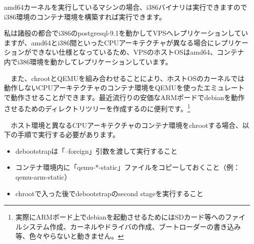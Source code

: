 \documentclass[mingoth,a4paper]{jsarticle}
\begin{document}
amd64カーネルを実行しているマシンの場合、i386バイナリは実行できますのでi386環境のコンテナ環境を構築すれば実行できます。

私は諸般の都合でi386のpostgresql-9.1を動かしてVPSへレプリケーションしていますが、amd64とi386間といったCPUアーキテクチャが異なる場合にレプリケーションができない仕様となっているため、VPSのホストOSはamd64、コンテナ内でi386環境を動かしてレプリケーションしています。


　また、chrootとQEMUを組み合わせることにより、ホストOSのカーネルでは動作しないCPUアーキテクチャのコンテナ環境をQEMUを使ったエミュレートで動作させることができます。最近流行りの安価なARMボードでdebianを動作させるためのディレクトリツリーを作成するのに便利です。\footnote{実際にARMボード上でdebianを起動させるためにはSDカード等へのファイルシステム作成、カーネルやドライバの作成、ブートローダーの書き込み等、色々やらないと動きません。}

　ホスト環境と異なるCPUアーキテクチャのコンテナ環境をchrootする場合、以下の手順で実行する必要があります。

\begin{itemize}
  \item debootstrapは「--foreign」引数を渡して実行すること
  \item コンテナ環境内に「qemu-*-static」ファイルをコピーしておくこと（例：qemu-arm-static）
  \item chrootで入った後でdebootstrapのsecond stageを実行すること
\end{itemize}
\end{document}
